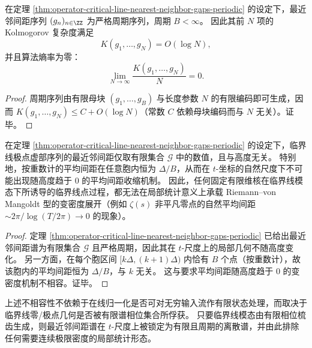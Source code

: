 \begin{proposition}[最近邻间距序列的算法熵率为零]\label{prop:operator-critical-line-gap-entropy-rate-zero}
在定理 \ref{thm:operator-critical-line-nearest-neighbor-gaps-periodic} 的设定下，最近邻间距序列 \((g_n)_{n\in\ZZ}\) 为严格周期序列，周期 \(B<\infty\)。
因此其前 \(N\) 项的 Kolmogorov 复杂度满足
\[
K(g_1,\dots,g_N)=O(\log N),
\]
并且算法熵率为零：
\[
\lim_{N\to\infty}\frac{K(g_1,\dots,g_N)}{N}=0.
\]
\end{proposition}
\begin{proof}
周期序列由有限母块 \((g_1,\dots,g_B)\) 与长度参数 \(N\) 的有限编码即可生成，因而 \(K(g_1,\dots,g_N)\le C+O(\log N)\)（常数 \(C\) 依赖母块编码而与 \(N\) 无关）。证毕。
\end{proof}

\begin{proposition}\label{prop:operator-fixed-kernel-local-density-obstruction}
在定理 \ref{thm:operator-critical-line-nearest-neighbor-gaps-periodic} 的设定下，临界线极点虚部序列的最近邻间距仅取有限集合 \(\mathcal{G}\) 中的数值，且与高度无关。
特别地，按重数计的平均间距在任意胞内恒为 \(\Delta/B\)，从而在 \(t\)-坐标的自然尺度下不可能出现随高度趋于 \(0\) 的平均间距收缩机制。
因此，任何固定有限维核在临界线模态下所诱导的临界线点过程，都无法在局部统计意义上承载 Riemann--von Mangoldt 型的变密度展开（例如 \(\zeta(s)\) 非平凡零点的自然平均间距 \(\sim 2\pi/\log(T/2\pi)\to 0\) 的现象）。
\end{proposition}
\begin{proof}
定理 \ref{thm:operator-critical-line-nearest-neighbor-gaps-periodic} 已给出最近邻间距谱为有限集合 \(\mathcal{G}\) 且严格周期，因此其在 \(t\)-尺度上的局部几何不随高度变化。
另一方面，在每个胞区间 \([k\Delta,(k+1)\Delta)\) 内恰有 \(B\) 个点（按重数计），故该胞内的平均间距恒为 \(\Delta/B\)，与 \(k\) 无关。
这与要求平均间距随高度趋于 \(0\) 的变密度机制不相容。证毕。
\end{proof}

\begin{remark}\label{rem:operator-obstruction-restatement-phase-comb-capture}
上述不相容性不依赖于在线归一化是否可对无穷输入流作有限状态处理，而取决于临界线零/极点几何是否被有限谱相位集合所俘获。
只要临界线模态由有限相位梳齿生成，则最近邻间距谱在 \(t\)-尺度上被锁定为有限且周期的离散谱，并由此排除任何需要连续极限密度的局部统计形态。
\end{remark}

